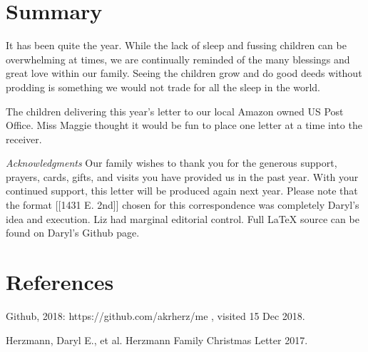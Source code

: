 \documentclass[letterpaper,11pt]{article}
\makeatletter
\def\refer{\par\noindent\hangindent\parindent\hangafter1}
\newenvironment{figurehere}
  {\def\@captype{figure}}
  {}
\makeatother
\begin{document}
\begin{multicols}{2}
\section{Summary}

It has been quite the year.  While the lack of sleep and fussing children can be
overwhelming at times, we are continually reminded of the many blessings and
great love within our family.  Seeing the children grow and do good deeds
without prodding is something we would not trade for all the sleep in the world.


\bigskip

\begin{figurehere}
 \centering   
 \caption{The children delivering this year's letter to our local Amazon owned
 US Post Office. Miss Maggie thought it would be fun to place one letter at 
 a time into the receiver.}
\end{figurehere}

\bigskip
  \emph{Acknowledgments} Our family wishes to thank you for the generous 
support, prayers, cards, gifts, and visits you have provided us in the past
year. With your continued support, this letter will be produced again
next year. Please note that the format [[1431 E. 2nd]] chosen for this
correspondence was completely Daryl's idea and execution. Liz had marginal
editorial control. Full \LaTeX\xspace source can be found on Daryl's Github
page.

\section{References}

\refer Github, 2018: https://github.com/akrherz/me , visited 15 Dec 2018.
\refer Herzmann, Daryl E., et al. Herzmann Family Christmas Letter 2017. 

\end{multicols}
\end{document}
